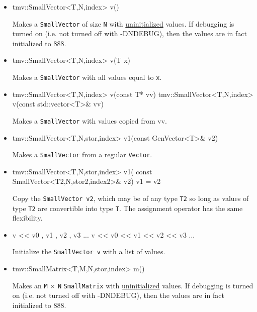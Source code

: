 \documentclass[twoside,letterpaper,11pt]{article}
\renewcommand{\tt}[1]{{\lstinline {#1}}}
\begin{document}
\begin{itemize}
\item 
\begin{tmvcode}
tmv::SmallVector<T,N,index> v()
\end{tmvcode}
Makes a \tt{SmallVector} of size \tt{N}
with \underline{uninitialized} values.
If debugging is turned on (i.e. not turned off
with -DNDEBUG), then the values are in fact initialized to 888. 

\item
\begin{tmvcode}
tmv::SmallVector<T,N,index> v(T x)
\end{tmvcode}
Makes a \tt{SmallVector} with all values equal to \tt{x}.

\item
\begin{tmvcode}
tmv::SmallVector<T,N,index> v(const T* vv)
tmv::SmallVector<T,N,index> v(const std::vector<T>& vv)
\end{tmvcode}
Makes a \tt{SmallVector} with values copied from vv.

\item 
\begin{tmvcode}
tmv::SmallVector<T,N,stor,index> v1(const GenVector<T>& v2)
\end{tmvcode}
Makes a \tt{SmallVector} from a regular \tt{Vector}.

\item
\begin{tmvcode}
tmv::SmallVector<T,N,stor,index> v1(
      const SmallVector<T2,N,stor2,index2>& v2)
v1 = v2
\end{tmvcode}
Copy the \tt{SmallVector v2}, which may be of any type \tt{T2} so long
as values of type \tt{T2} are convertible into type \tt{T}.
The assignment operator has the same flexibility.

\item
\begin{tmvcode}
v << v0 , v1 , v2 , v3 ...
v << v0 << v1 << v2 << v3 ...
\end{tmvcode}
Initialize the \tt{SmallVector v} with a list of values.

\item 
\begin{tmvcode}
tmv::SmallMatrix<T,M,N,stor,index> m()
\end{tmvcode}
Makes an \tt{M} $\times$ \tt{N} \tt{SmallMatrix} 
with \underline{uninitialized} values.
If debugging is turned on (i.e. not turned off
with -DNDEBUG), then the values are in fact initialized to 888. 


\end{itemize}
\end{document}
